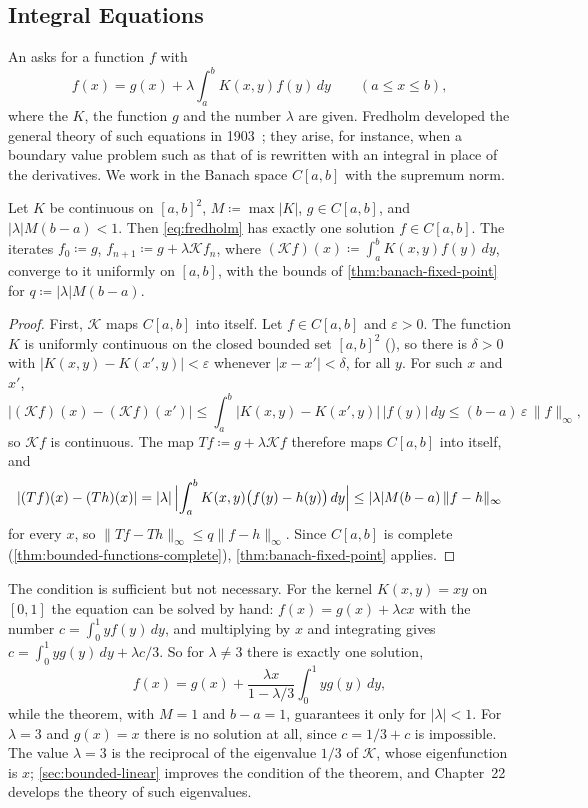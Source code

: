 \subsection{Integral Equations}

An  asks for a function $f$ with
\begin{equation}
f(x)=g(x)+\lambda\int_a^bK(x,y)f(y)\,dy\qquad(a\le x\le b),
\label{eq:fredholm}
\end{equation}
where the  $K$, the function $g$ and the number $\lambda$ are given. Fredholm developed the general theory of such equations in 1903~\cite{fredholm1903}; they arise, for instance, when a boundary value problem such as that of  is rewritten with an integral in place of the derivatives. We work in the Banach space $C[a,b]$ with the supremum norm.

\begin{theorem}
\label{thm:fredholm-small}
Let $K$ be continuous on $[a,b]^2$, $M\coloneqq\max|K|$, $g\in C[a,b]$, and $|\lambda|M(b-a)<1$. Then \eqref{eq:fredholm} has exactly one solution $f\in C[a,b]$. The iterates $f_0\coloneqq g$, $f_{n+1}\coloneqq g+\lambda\mathcal Kf_n$, where $(\mathcal Kf)(x)\coloneqq\int_a^bK(x,y)f(y)\,dy$, converge to it uniformly on $[a,b]$, with the bounds of \cref{thm:banach-fixed-point} for $q\coloneqq|\lambda|M(b-a)$.
\end{theorem}

\begin{proof}
First, $\mathcal K$ maps $C[a,b]$ into itself. Let $f\in C[a,b]$ and $\varepsilon>0$. The function $K$ is uniformly continuous on the closed bounded set $[a,b]^2$ (), so there is $\delta>0$ with $|K(x,y)-K(x',y)|<\varepsilon$ whenever $|x-x'|<\delta$, for all $y$. For such $x$ and $x'$,
\[
|(\mathcal Kf)(x)-(\mathcal Kf)(x')|\le\int_a^b|K(x,y)-K(x',y)|\,|f(y)|\,dy\le(b-a)\,\varepsilon\,\|f\|_\infty ,
\]
so $\mathcal Kf$ is continuous. The map $Tf\coloneqq g+\lambda\mathcal Kf$ therefore maps $C[a,b]$ into itself, and
\[
|(Tf)(x)-(Th)(x)|=|\lambda|\,\Bigl|\int_a^bK(x,y)\bigl(f(y)-h(y)\bigr)\,dy\Bigr|\le|\lambda|M(b-a)\,\|f-h\|_\infty
\]
for every $x$, so $\|Tf-Th\|_\infty\le q\|f-h\|_\infty$. Since $C[a,b]$ is complete (\cref{thm:bounded-functions-complete}), \cref{thm:banach-fixed-point} applies.
\end{proof}

The condition is sufficient but not necessary. For the kernel $K(x,y)=xy$ on $[0,1]$ the equation can be solved by hand: $f(x)=g(x)+\lambda cx$ with the number $c=\int_0^1yf(y)\,dy$, and multiplying by $x$ and integrating gives $c=\int_0^1yg(y)\,dy+\lambda c/3$. So for $\lambda\ne3$ there is exactly one solution,
\[
f(x)=g(x)+\frac{\lambda x}{1-\lambda/3}\int_0^1yg(y)\,dy ,
\]
while the theorem, with $M=1$ and $b-a=1$, guarantees it only for $|\lambda|<1$. For $\lambda=3$ and $g(x)=x$ there is no solution at all, since $c=1/3+c$ is impossible. The value $\lambda=3$ is the reciprocal of the eigenvalue $1/3$ of $\mathcal K$, whose eigenfunction is $x$; \cref{sec:bounded-linear} improves the condition of the theorem, and Chapter~22 develops the theory of such eigenvalues.

